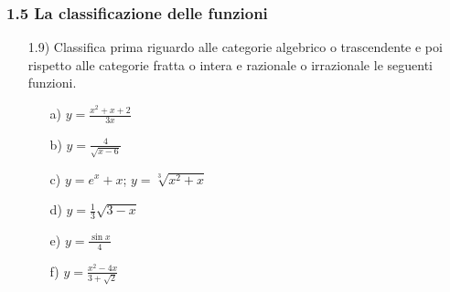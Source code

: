 \subsubsection*{1.5 La classificazione delle funzioni}
\begin{itemize}
  \item[1.9)] Classifica prima riguardo alle categorie algebrico o 
trascendente e poi rispetto alle categorie fratta o intera e razionale o 
irrazionale le seguenti funzioni.
  \begin{itemize}
  \item[a)] $y=\frac{x^2+x+2}{3x}$
  \item[b)] $y=\frac{4}{\sqrt{x-6}}$
  \item[c)] $y=e^x+x$; $y=\sqrt[3]{x^2+x}$
  \item[d)] $y=\frac{1}{3}\sqrt{3-x}$
  \item[e)] $y=\frac{\sin x}{4}$
  \item[f)] $y=\frac{x^2-4x}{3+\sqrt{2}}$
  \end{itemize}
\end{itemize}

